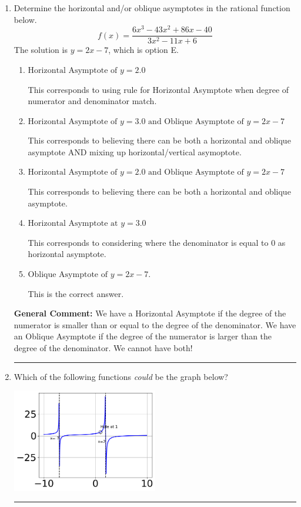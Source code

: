 \documentclass{extbook}[14pt]
\newcommand{\litem}[1]{\item #1

\rule{\textwidth}{0.4pt}}
\begin{document}
\begin{enumerate}\litem{
Determine the horizontal and/or oblique asymptotes in the rational function below.
\[ f(x) = \frac{6x^{3} -43 x^{2} +86 x -40}{3x^{2} -11 x + 6} \]The solution is \( y = 2x -7 \), which is option E.\begin{enumerate}[label=\Alph*.]
\item \( \text{Horizontal Asymptote of } y = 2.0  \)

This corresponds to using rule for Horizontal Asymptote when degree of numerator and denominator match.
\item \( \text{Horizontal Asymptote of } y = 3.0 \text{ and Oblique Asymptote of } y = 2x -7 \)

This corresponds to believing there can be both a horizontal and oblique asymptote AND mixing up horizontal/vertical asymoptote.
\item \( \text{Horizontal Asymptote of } y = 2.0 \text{ and Oblique Asymptote of } y = 2x -7 \)

This corresponds to believing there can be both a horizontal and oblique asymptote.
\item \( \text{Horizontal Asymptote at } y = 3.0 \)

This corresponds to considering where the denominator is equal to 0 as horizontal asymptote.
\item \( \text{Oblique Asymptote of } y = 2x -7. \)

This is the correct answer.
\end{enumerate}

\textbf{General Comment:} We have a Horizontal Asymptote if the degree of the numerator is smaller than or equal to the degree of the denominator. We have an Oblique Asymptote if the degree of the numerator is larger than the degree of the denominator. We cannot have both!
}
\litem{
Which of the following functions \textit{could} be the graph below?

\begin{center}
    \includegraphics[width=0.5\textwidth]{../Figures/identifyGraphOfRationalFunctionCopyA.png}
\end{center}


}
\end{enumerate}
\end{document}
